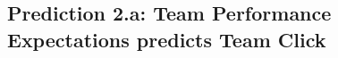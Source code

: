 \begin{CJK}{UTF8}{gbsn}
















       \subsection{Prediction 2.a: Team Performance Expectations predicts Team Click\label{app8:prediction2a}}



\end{CJK}
